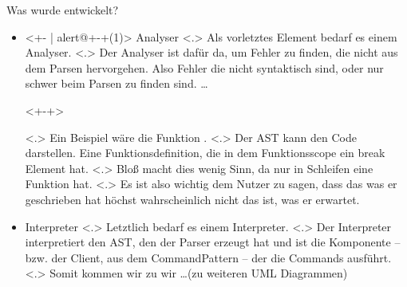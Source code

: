 \begin{frame}{Was wurde entwickelt?}
\begin{itemize}[<+- | alert@+>]
{            }%
      \item<+- | alert@+-+(1)>
        Analyser%
            \note[item]<.>{
              Als vorletztes Element bedarf es einem Analyser.
            }
            \note[item]<.>{
              Der Analyser ist dafür da, um Fehler zu finden, die nicht aus dem Parsen hervorgehen. Also Fehler die nicht syntaktisch sind, oder nur schwer beim Parsen zu finden sind.
              \ldots
            }
        \begin{uncoverenv}<+-+>%
        \end{uncoverenv}
            \note[item]<.>{
              Ein Beispiel wäre die Funktion .
              }
            \note[item]<.>{
              Der AST kann den Code darstellen. Eine Funktionsdefinition, die in dem Funktionsscope ein break Element hat.
            }
            \note[item]<.>{
              Bloß macht dies wenig Sinn, da  nur in Schleifen eine Funktion hat.
            }
            \note[item]<.>{
              Es ist also wichtig dem Nutzer zu sagen, dass das was er geschrieben hat höchst wahrscheinlich nicht das ist, was er erwartet.
            }
      \item
        Interpreter
            \note[item]<.>{
              Letztlich bedarf es einem Interpreter.
            }
            \note[item]<.>{
              Der Interpreter interpretiert den AST, den der Parser erzeugt hat und ist die Komponente -- bzw. der Client, aus dem CommandPattern -- der die Commands ausführt.
            }
            \note[item]<.>{
              Somit kommen wir zu wir \ldots (zu weiteren UML Diagrammen)
            }
    \end{itemize}
  \end{frame}

